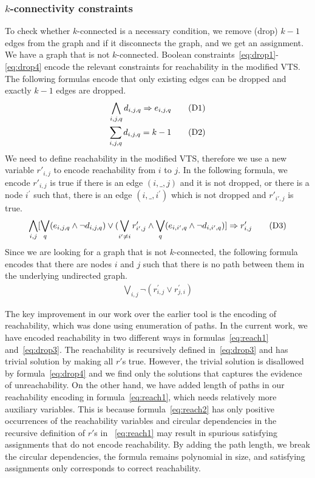 \subsubsection{$k$-connectivity constraints}
To check whether $k$-connected is a necessary condition, we remove (drop) $k-1$ edges from the graph and if it
disconnects the graph, and we get an assignment. We have a graph that is not  $k$-connected.
%
Boolean constraints~\ref{eq:drop1}-\ref{eq:drop4}
encode the relevant constraints for reachability
in the modified VTS. 
%
The following formulas encode that only
existing edges can be dropped and exactly $k-1$ edges are dropped.
\begin{align}
  \bigwedge\limits_{i,j,q} d_{i,j,q} \Rightarrow e_{i,j,q}  \tag{D1}\label{eq:drop1}\\
  \sum_{i,j,q} d_{i,j,q} = k-1
  \tag{D2}\label{eq:drop2}
\end{align}
We need to define reachability in the modified VTS, therefore we use
a new variable $r'_{i,j}$ to encode reachability from $i$ to $j$.
In the following formula, we encode $r'_{i,j}$ is true if there is an
edge $(i,\_,j)$ and it is not dropped, or there is a node
$i^{\prime}$ such that, there is an edge $(i,\_,i^{\prime})$ which is
not dropped and $r'_{i',j}$ is true.
\begin{align}
\bigwedge\limits_{i,j}  [\bigvee_{q} (e_{i,j,q} \land  \neg d_{i,j,q}) \lor  (\bigvee_{i' \neq i}  r^{\prime}_{i',j} \land  \bigvee_{q} (e_{i,i',q} \land \neg d_{i,i',q}) ] \Rightarrow r^{\prime}_{i,j}  
  \tag{D3}\label{eq:drop3}
\end{align}
Since we are looking for a graph that is not $k$-connected,
the following formula encodes that there are nodes $i$ and $j$ such that
there is no path between them in the underlying undirected graph.
\begin{align}
   \bigvee\limits_{i,j} \neg (r^{\prime}_{i,j} \lor r^{\prime}_{j,i})
  \tag{D4}\label{eq:drop4}
\end{align}

The key improvement in our work over the earlier tool is the
encoding of reachability, which was done using enumeration of paths.
%
In the current work, we have encoded reachability in two different
ways in formulas~\eqref{eq:reach1} and~\eqref{eq:drop3}.
%
The reachability is recursively defined in~\eqref{eq:drop3} and has
trivial solution by making all $r'$s true.
%
However, the trivial solution is disallowed by formula~\eqref{eq:drop4} and we find
only the solutions that captures the evidence of unreachability.
%
On the other hand,
we have added length of paths in our reachability encoding in formula~\eqref{eq:reach1},
which needs relatively more auxiliary variables.
%
This is because formula~\eqref{eq:reach2} has only positive
occurrences of the reachability variables and circular dependencies in
the recursive definition of $r'$s in ~\eqref{eq:reach1} may result
in spurious satisfying assignments that do not encode reachability.
%
By adding the path length, we break the circular dependencies, the
formula remains polynomial in size, and satisfying assignments only
corresponds to correct reachability.

